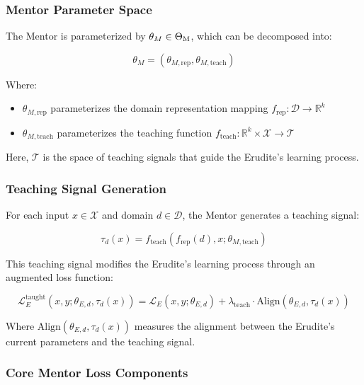\subsubsection{Mentor Parameter Space}

The Mentor is parameterized by $\theta_M \in \Theta_{\text{M}}$, which can be decomposed into:

\begin{equation}
\theta_M = (\theta_{M,\text{rep}}, \theta_{M,\text{teach}})
\end{equation}

Where:
\begin{itemize}
\item $\theta_{M,\text{rep}}$ parameterizes the domain representation mapping $f_{\text{rep}} : \mathcal{D} \rightarrow \mathbb{R}^k$
\item $\theta_{M,\text{teach}}$ parameterizes the teaching function $f_{\text{teach}} : \mathbb{R}^k \times \mathcal{X} \rightarrow \mathcal{T}$
\end{itemize}

Here, $\mathcal{T}$ is the space of teaching signals that guide the Erudite's learning process.

\subsubsection{Teaching Signal Generation}

For each input $x \in \mathcal{X}$ and domain $d \in \mathcal{D}$, the Mentor generates a teaching signal:

\begin{equation}
\tau_d(x) = f_{\text{teach}}(f_{\text{rep}}(d), x; \theta_{M,\text{teach}})
\end{equation}

This teaching signal modifies the Erudite's learning process through an augmented loss function:

\begin{equation}
\mathcal{L}_{E}^{\text{taught}}(x, y; \theta_{E,d}, \tau_d(x)) = \mathcal{L}_E(x, y; \theta_{E,d}) + \lambda_{\text{teach}} \cdot \text{Align}(\theta_{E,d}, \tau_d(x))
\end{equation}

Where $\text{Align}(\theta_{E,d}, \tau_d(x))$ measures the alignment between the Erudite's current parameters and the teaching signal.

\subsubsection{Core Mentor Loss Components}

